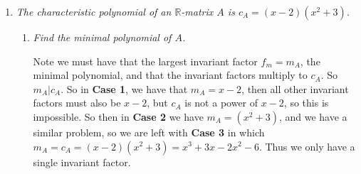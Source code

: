 \documentclass[9pt,reqno,twoside]{amsbook}
\theoremstyle{plain}
\numberwithin{section}{chapter}
\numberwithin{equation}{chapter}
\theoremstyle{definition}
\theoremstyle{remark}
\theoremstyle{plain}
\newcommand{\R}{\mathbb{R}}
\newcommand{\Q}{\mathbb{Q}}
\renewcommand{\c}{\mathbb{C}}
\newcommand{\bb}{\vspace{3mm}}
\newcommand{\lpar}{\left(}
\newcommand{\rpar}{\right)}
\begin{document}
\begin{enumerate}[label=\arabic*.]
\bb\bb\bb
Leibman's solution: $T: V\to V$. $T$ satisfies $x^3 - 1 = (x - 1)(x^2 + x + 1)$. But what field this is over matters since we don't know if this right part factors, so we assume it's over $\Q$. Over $\c$ it splits completely, and if one of the factors is the minimal polynomial, then it's just a scalar matrix. So we assume $V$ is a $\Q$-vector space. If $m_T(x) = x - 1$, then we have $T = I$. If $m_T(x) = x^2 + x + 1$, then we have $f_1 = f_2 = f_3 = x^2 + x + 1$, so deg$(\prod f_i)$ is even, and $\neq 5$. Last case is $m_T(x) = x^3 - 1$, then either $f_1 = f_2 = x-1$, $f_3 = x^3 - 1$, or $f_1 = x^2 + x + 1$, $f_3 = x^3 = 1$. We have:
$$
\newcommand*{\boxone}{\multicolumn{1}{c|}{1}}
\newcommand*{\boxtwo}{\multicolumn{1}{|c|}{1}}
\newcommand*{\boxk}{\multicolumn{1}{|c}{A_k}}
\newcommand*{\boxdots}{\multicolumn{1}{|c|}{\ddots}}
\newcommand\bigzero{\makebox(0,0){\text{\huge0}}}
A = \lpar
\begin{array}{cc|ccc}
\boxone & 0 & & & \text{\huge0}\\
\cline{1-2}
0 & \boxtwo &  & \\
\hline
 & & 0&0   & 1\\
 &&1 & 0 & 0\\
\text{\huge0} &  &0 &1 &1
\end{array} \rpar. 
$$
Or:
$$
\newcommand*{\boxone}{\multicolumn{1}{c|}{0}}
\newcommand*{\boxtwo}{\multicolumn{1}{|c|}{-1}}
\newcommand*{\boxk}{\multicolumn{1}{|c}{A_k}}
\newcommand*{\boxdots}{\multicolumn{1}{|c|}{\ddots}}
\newcommand\bigzero{\makebox(0,0){\text{\huge0}}}
A = \lpar
\begin{array}{cc|ccc}
\boxone & -1 & & & \text{\huge0}\\
\cline{1-2}
1 & \boxtwo &  & \\
\hline
 & & 0&0   & 1\\
 &&1 & 0 & 0\\
\text{\huge0} &  &0 &1 &1
\end{array} \rpar. 
$$

And elementary divisors $x^2 + x + 1$, $x^2 + x + 1,x - 1$. 
\bb

\item \textit{The characteristic polynomial of an $\R$-matrix $A$ is $c_A = (x - 2)(x^2 + 3)$. }

\begin{enumerate}
\item  \textit{Find the minimal polynomial of $A$. }

Note we must have that the largest invariant factor $f_m = m_A$, the minimal polynomial, and that the invariant factors multiply to $c_A$. So $m_A|c_A$. So in \textbf{Case 1}, we have that $m_A = x - 2$, then all other invariant factors must also be $x - 2$, but $c_A$ is not a power of $x - 2$, so this is impossible. So then in \textbf{Case 2} we have $m_A = (x^2  + 3)$, and we have a similar problem, so we are left with \textbf{Case 3} in which $m_A = c_A = (x - 2)(x^2 + 3) = x^3 + 3x - 2x^2 - 6$. Thus we only have a single invariant factor. 


\end{enumerate}
\end{enumerate}
\end{document}
